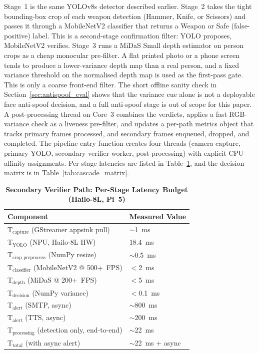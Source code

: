 \documentclass{ieeeaccess}
\begin{document}
Stage~1 is the same YOLOv8s detector described earlier. Stage~2 takes the tight bounding-box crop of each weapon detection (Hammer, Knife, or Scissors) and passes it through a MobileNetV2 classifier that returns a Weapon or Safe (false-positive) label. This is a second-stage confirmation filter: YOLO proposes, MobileNetV2 verifies. Stage~3 runs a MiDaS Small depth estimator on person crops as a cheap monocular pre-filter. A flat printed photo or a phone screen tends to produce a lower-variance depth map than a real person, and a fixed variance threshold on the normalised depth map is used as the first-pass gate. This is only a coarse front-end filter. The short offline sanity check in Section~\ref{sec:antispoof_eval} shows that the variance cue alone is not a deployable face anti-spoof decision, and a full anti-spoof stage is out of scope for this paper. A post-processing thread on Core~3 combines the verdicts, applies a fast RGB-variance check as a liveness pre-filter, and updates a per-path metrics object that tracks primary frames processed, and secondary frames enqueued, dropped, and completed. The pipeline entry function creates four threads (camera capture, primary YOLO, secondary verifier worker, post-processing) with explicit CPU affinity assignments. Per-stage latencies are listed in Table~\ref{tab:cascade_latency}, and the decision matrix is in Table~\ref{tab:cascade_matrix}.

\begin{table}[ht!]
\caption{\textbf{Secondary Verifier Path: Per-Stage Latency Budget (Hailo-8L, Pi~5)}}
\label{tab:cascade_latency}
\centering\small
\begin{tabular}{|l|l|}
\hline
\textbf{Component} & \textbf{Measured Value} \\
\hline
T$_{\text{capture}}$ (GStreamer appsink pull) & $\sim$1~ms \\
T$_{\text{YOLO}}$ (NPU, Hailo-8L HW) & 18.4~ms \\
T$_{\text{crop\_preprocess}}$ (NumPy resize) & $\sim$0.5~ms \\
T$_{\text{classifier}}$ (MobileNetV2 @ 500+~FPS) & $<$2~ms \\
T$_{\text{depth}}$ (MiDaS @ 200+~FPS) & $<$5~ms \\
T$_{\text{decision}}$ (NumPy variance) & $<$0.1~ms \\
T$_{\text{alert}}$ (SMTP, async) & $\sim$800~ms \\
T$_{\text{alert}}$ (TTS, async) & $\sim$200~ms \\
T$_{\text{processing}}$ (detection only, end-to-end) & $\sim$22~ms \\
T$_{\text{total}}$ (with async alert) & $\sim$22~ms + async \\
\hline
\end{tabular}
\end{table}
\end{document}
